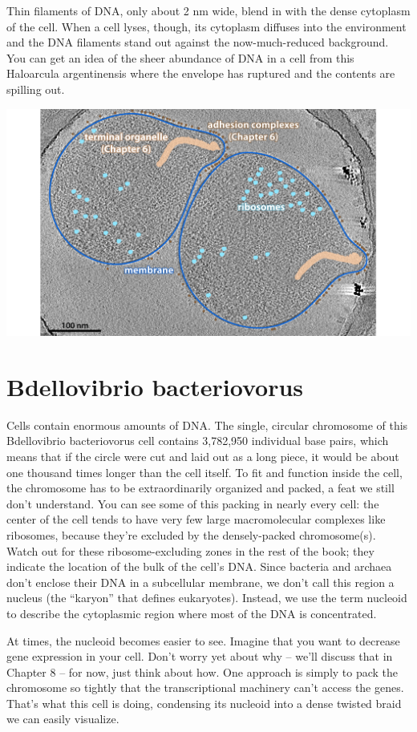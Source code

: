 \documentclass[]{tufte-book}
\begin{document}
Thin filaments of DNA, only about 2 nm wide, blend in with the dense
cytoplasm of the cell. When a cell lyses, though, its cytoplasm diffuses
into the environment and the DNA filaments stand out against the
now-much-reduced background. You can get an idea of the sheer abundance
of DNA in a cell from this Haloarcula argentinensis where the envelope
has ruptured and the contents are spilling out.

\includegraphics{img/02_static/2_1_Mgenitalium}

\section{Bdellovibrio bacteriovorus}\label{bdellovibrio-bacteriovorus}

Cells contain enormous amounts of DNA. The single, circular chromosome
of this Bdellovibrio bacteriovorus cell contains 3,782,950 individual
base pairs, which means that if the circle were cut and laid out as a
long piece, it would be about one thousand times longer than the cell
itself. To fit and function inside the cell, the chromosome has to be
extraordinarily organized and packed, a feat we still don't understand.
You can see some of this packing in nearly every cell: the center of the
cell tends to have very few large macromolecular complexes like
ribosomes, because they're excluded by the densely-packed chromosome(s).
Watch out for these ribosome-excluding zones in the rest of the book;
they indicate the location of the bulk of the cell's DNA. Since bacteria
and archaea don't enclose their DNA in a subcellular membrane, we don't
call this region a nucleus (the ``karyon'' that defines eukaryotes).
Instead, we use the term nucleoid to describe the cytoplasmic region
where most of the DNA is concentrated.

At times, the nucleoid becomes easier to see. Imagine that you want to
decrease gene expression in your cell. Don't worry yet about why --
we'll discuss that in Chapter 8 -- for now, just think about how. One
approach is simply to pack the chromosome so tightly that the
transcriptional machinery can't access the genes. That's what this cell
is doing, condensing its nucleoid into a dense twisted braid we can
easily visualize.
\end{document}
